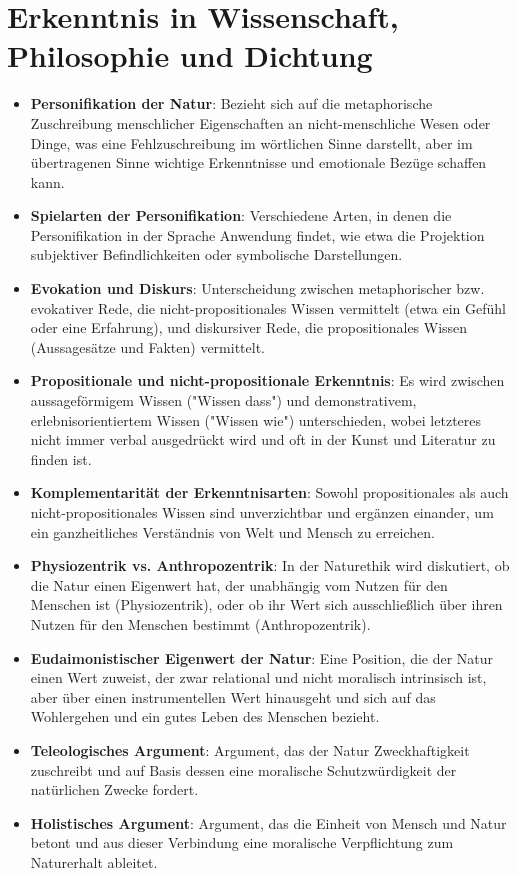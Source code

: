 \documentclass{article}
\begin{document}
\newpage
\section{Erkenntnis in Wissenschaft, Philosophie und Dichtung}

\begin{itemize}
	\item \textbf{Personifikation der Natur}: Bezieht sich auf die metaphorische Zuschreibung menschlicher Eigenschaften an nicht-menschliche Wesen oder Dinge, was eine Fehlzuschreibung im wörtlichen Sinne darstellt, aber im übertragenen Sinne wichtige Erkenntnisse und emotionale Bezüge schaffen kann.

	\item \textbf{Spielarten der Personifikation}: Verschiedene Arten, in denen die Personifikation in der Sprache Anwendung findet, wie etwa die Projektion subjektiver Befindlichkeiten oder symbolische Darstellungen.

	\item \textbf{Evokation und Diskurs}: Unterscheidung zwischen metaphorischer bzw. evokativer Rede, die nicht-propositionales Wissen vermittelt (etwa ein Gefühl oder eine Erfahrung), und diskursiver Rede, die propositionales Wissen (Aussagesätze und Fakten) vermittelt.

	\item \textbf{Propositionale und nicht-propositionale Erkenntnis}: Es wird zwischen aussageförmigem Wissen ("Wissen dass") und demonstrativem, erlebnisorientiertem Wissen ("Wissen wie") unterschieden, wobei letzteres nicht immer verbal ausgedrückt wird und oft in der Kunst und Literatur zu finden ist.

	\item \textbf{Komplementarität der Erkenntnisarten}: Sowohl propositionales als auch nicht-propositionales Wissen sind unverzichtbar und ergänzen einander, um ein ganzheitliches Verständnis von Welt und Mensch zu erreichen.

	\item \textbf{Physiozentrik vs. Anthropozentrik}: In der Naturethik wird diskutiert, ob die Natur einen Eigenwert hat, der unabhängig vom Nutzen für den Menschen ist (Physiozentrik), oder ob ihr Wert sich ausschließlich über ihren Nutzen für den Menschen bestimmt (Anthropozentrik).

	\item \textbf{Eudaimonistischer Eigenwert der Natur}: Eine Position, die der Natur einen Wert zuweist, der zwar relational und nicht moralisch intrinsisch ist, aber über einen instrumentellen Wert hinausgeht und sich auf das Wohlergehen und ein gutes Leben des Menschen bezieht.

	\item \textbf{Teleologisches Argument}: Argument, das der Natur Zweckhaftigkeit zuschreibt und auf Basis dessen eine moralische Schutzwürdigkeit der natürlichen Zwecke fordert.

	\item \textbf{Holistisches Argument}: Argument, das die Einheit von Mensch und Natur betont und aus dieser Verbindung eine moralische Verpflichtung zum Naturerhalt ableitet.
\end{itemize}
\end{document}
